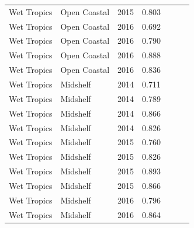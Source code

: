 \begin{longtable}{llccccc}
  Wet Tropics & Open Coastal & 2015 & 0.803 & \cellcolor[HTML]{B0D235}{B} & \cellcolor[HTML]{00734D}{A} & \cellcolor[HTML]{B0D235}{B} \\ 
  Wet Tropics & Open Coastal & 2016 & 0.692 & \cellcolor[HTML]{B0D235}{B} & \cellcolor[HTML]{B0D235}{B} & \cellcolor[HTML]{B0D235}{B} \\ 
  Wet Tropics & Open Coastal & 2016 & 0.790 & \cellcolor[HTML]{B0D235}{B} & \cellcolor[HTML]{B0D235}{B} & \cellcolor[HTML]{B0D235}{B} \\ 
  Wet Tropics & Open Coastal & 2016 & 0.888 & \cellcolor[HTML]{00734D}{A} & \cellcolor[HTML]{00734D}{A} & \cellcolor[HTML]{00734D}{A} \\ 
  Wet Tropics & Open Coastal & 2016 & 0.836 & \cellcolor[HTML]{00734D}{A} & \cellcolor[HTML]{00734D}{A} & \cellcolor[HTML]{B0D235}{B} \\ 
  Wet Tropics & Midshelf & 2014 & 0.711 & \cellcolor[HTML]{B0D235}{B} & \cellcolor[HTML]{B0D235}{B} & \cellcolor[HTML]{B0D235}{B} \\ 
  Wet Tropics & Midshelf & 2014 & 0.789 & \cellcolor[HTML]{B0D235}{B} & \cellcolor[HTML]{B0D235}{B} & \cellcolor[HTML]{B0D235}{B} \\ 
  Wet Tropics & Midshelf & 2014 & 0.866 & \cellcolor[HTML]{00734D}{A} & \cellcolor[HTML]{00734D}{A} & \cellcolor[HTML]{00734D}{A} \\ 
  Wet Tropics & Midshelf & 2014 & 0.826 & \cellcolor[HTML]{B0D235}{B} & \cellcolor[HTML]{00734D}{A} & \cellcolor[HTML]{B0D235}{B} \\ 
  Wet Tropics & Midshelf & 2015 & 0.760 & \cellcolor[HTML]{B0D235}{B} & \cellcolor[HTML]{B0D235}{B} & \cellcolor[HTML]{B0D235}{B} \\ 
  Wet Tropics & Midshelf & 2015 & 0.826 & \cellcolor[HTML]{B0D235}{B} & \cellcolor[HTML]{00734D}{A} & \cellcolor[HTML]{B0D235}{B} \\ 
  Wet Tropics & Midshelf & 2015 & 0.893 & \cellcolor[HTML]{00734D}{A} & \cellcolor[HTML]{00734D}{A} & \cellcolor[HTML]{00734D}{A} \\ 
  Wet Tropics & Midshelf & 2015 & 0.866 & \cellcolor[HTML]{00734D}{A} & \cellcolor[HTML]{00734D}{A} & \cellcolor[HTML]{00734D}{A} \\ 
  Wet Tropics & Midshelf & 2016 & 0.796 & \cellcolor[HTML]{B0D235}{B} & \cellcolor[HTML]{B0D235}{B} & \cellcolor[HTML]{B0D235}{B} \\ 
  Wet Tropics & Midshelf & 2016 & 0.864 & \cellcolor[HTML]{00734D}{A} & \cellcolor[HTML]{00734D}{A} & \cellcolor[HTML]{00734D}{A} \\ 

\end{longtable}
